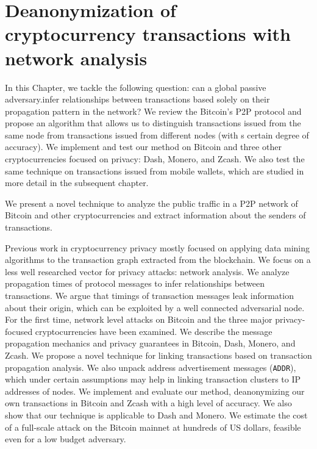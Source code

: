 \chapter{Deanonymization of cryptocurrency transactions with network analysis} %

\label{Chapter03Clustering}

In this Chapter, we tackle the following question: can a global passive adversary.infer relationships between transactions based solely on their propagation pattern in the network?
We review the Bitcoin's P2P protocol and propose an algorithm that allows us to distinguish transactions issued from the same node from transactions issued from different nodes (with s certain degree of accuracy).
We implement and test our method on Bitcoin and three other cryptocurrencies focused on privacy: Dash, Monero, and Zcash.
We also test the same technique on transactions issued from mobile wallets, which are studied in more detail in the subsequent chapter.

We present a novel technique to analyze the public traffic in a P2P network of Bitcoin and other cryptocurrencies and extract information about the senders of transactions.

Previous work in cryptocurrency privacy mostly focused on applying data mining algorithms to the transaction graph extracted from the blockchain.
We focus on a less well researched vector for privacy attacks: network analysis.
We analyze propagation times of protocol messages to infer relationships between transactions.
We argue that timings of transaction messages leak information about their origin, which can be exploited by a well connected adversarial node.
For the first time, network level attacks on Bitcoin and the three major privacy-focused cryptocurrencies have been examined.
We describe the message propagation mechanics and privacy guarantees in Bitcoin, Dash, Monero, and Zcash.
We propose a novel technique for linking transactions based on transaction propagation analysis.
We also unpack address advertisement messages (\texttt{ADDR}), which under certain assumptions may help in linking transaction clusters to IP addresses of nodes.
We implement and evaluate our method, deanonymizing our own transactions in Bitcoin and Zcash with a high level of accuracy.
We also show that our technique is applicable to Dash and Monero.
We estimate the cost of a full-scale attack on the Bitcoin mainnet at hundreds of US dollars, feasible even for a low budget adversary.

